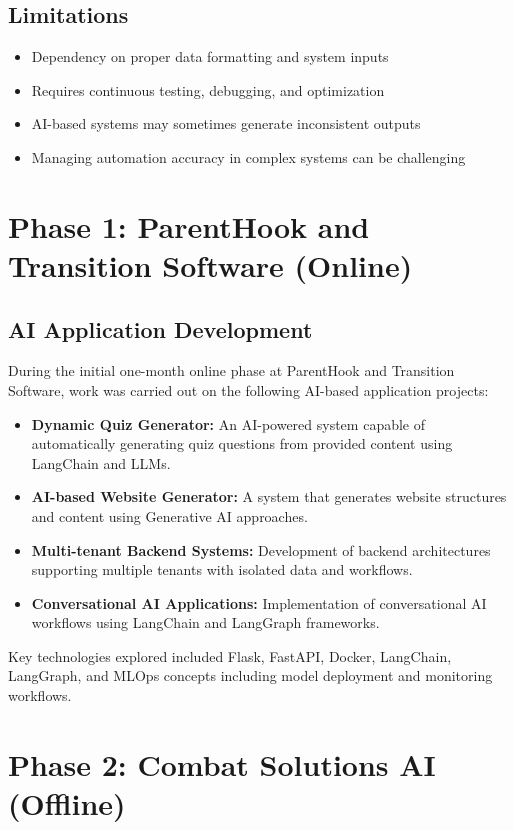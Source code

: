 \documentclass[12pt,a4paper]{report}
\begin{document}
\subsection{Limitations}

\begin{itemize}[leftmargin=1.5cm]
    \item Dependency on proper data formatting and system inputs
    \item Requires continuous testing, debugging, and optimization
    \item AI-based systems may sometimes generate inconsistent outputs
    \item Managing automation accuracy in complex systems can be challenging
\end{itemize}

\section{Phase 1: ParentHook and Transition Software (Online)}

\subsection{AI Application Development}

During the initial one-month online phase at ParentHook and Transition Software, work was carried out on the following AI-based application projects:
\begin{itemize}[leftmargin=1.5cm]
    \item \textbf{Dynamic Quiz Generator:} An AI-powered system capable of automatically generating quiz questions from provided content using LangChain and LLMs.
    \item \textbf{AI-based Website Generator:} A system that generates website structures and content using Generative AI approaches.
    \item \textbf{Multi-tenant Backend Systems:} Development of backend architectures supporting multiple tenants with isolated data and workflows.
    \item \textbf{Conversational AI Applications:} Implementation of conversational AI workflows using LangChain and LangGraph frameworks.
\end{itemize}

Key technologies explored included Flask, FastAPI, Docker, LangChain, LangGraph, and MLOps concepts including model deployment and monitoring workflows.

\section{Phase 2: Combat Solutions AI (Offline)}
\end{document}

